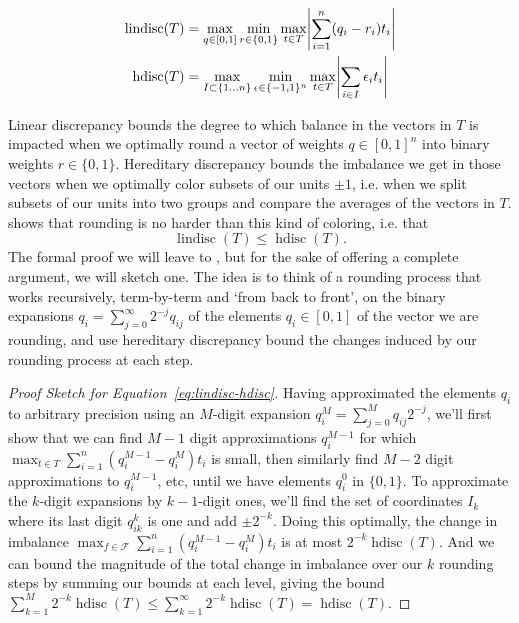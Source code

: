 \documentclass{article}
\DeclarePairedDelimiter\abs{\lvert}{\rvert}
\theoremstyle{definition}
\DeclareMathOperator{\hdisc}{hdisc}
\DeclareMathOperator{\lindisc}{lindisc}
\newcommand{\F}{\ensuremath{\mathcal{F}}}
\newcommand{\<}{\langle}
\renewcommand{\>}{\rangle}
\begin{document}
\begin{refsection}
\begin{equation}
\begin{aligned}
  \label{eq:discrepancy}
  \lindisc(T) &= \max_{q \in [0,1]}\min_{r \in \{0,1\}}\max_{t \in T}\abs*{\sum_{i=1}^n (q_i-r_i) t_i} \\
  \hdisc(T) &= \max_{I \subset \{1 \ldots n\}}\min_{\epsilon \in \{-1,1\}^n}\max_{t \in T} \abs*{\sum_{i\in I} \epsilon_i t_i}
\end{aligned}
\end{equation}

Linear discrepancy bounds the degree to which balance in the vectors in $T$ is impacted
when we optimally round a vector of weights $q \in [0,1]^n$ into binary weights $r \in \{0,1\}$.
Hereditary discrepancy bounds the imbalance we get in those vectors when we optimally
color subsets of our units $\pm 1$, i.e. when we split subsets of our units into two groups and
compare the averages of the vectors in $T$. \citet[Corollary 1]{lovasz1986discrepancy} shows that rounding
is no harder than this kind of coloring, i.e. that
\begin{equation}
\label{eq:lindisc-hdisc}
\lindisc(T) \le \hdisc(T).
\end{equation}
The formal proof we will leave to \citet{lovasz1986discrepancy}, but for the
sake of offering a complete argument, we will sketch one. The idea is to think of a rounding process that
works recursively, term-by-term  and `from back to front', on the binary expansions $q_i = \sum_{j=0}^{\infty} 2^{-j} q_{ij}$
of the elements $q_i \in [0,1]$ of the vector we are rounding, and use hereditary discrepancy bound the changes induced
by our rounding process at each step.
\begin{proof}[Proof Sketch for Equation~\ref{eq:lindisc-hdisc}]
Having approximated the elements $q_i$ to arbitrary precision using an $M$-digit expansion
$q_i^M=\sum_{j=0}^M q_{ij} 2^{-j}$,
we'll first show that we can find $M-1$ digit approximations $q_i^{M-1}$ for which
$\max_{t \in T} \sum_{i=1}^n (q_i^{M-1}-q_i^M)t_i$ is small, then similarly
find $M-2$ digit approximations to $q_i^{M-1}$, etc, until we have elements $q_i^0$ in $\{0,1\}$.
To approximate the $k$-digit expansions by $k-1$-digit ones, we'll find the set of coordinates
$I_k$ where its last digit $q^k_{ik}$ is one and add $\pm 2^{-k}$. Doing this optimally, the
change in imbalance $\max_{f \in \F} \sum_{i = 1}^n (q_i^{M-1}-q_i^M)t_i$ is at most $2^{-k}\hdisc(T)$.
And we can bound the magnitude of the total change in imbalance over our $k$ rounding steps by
summing our bounds at each level, giving the bound $\sum_{k=1}^{M} 2^{-k} \hdisc(T) \le \sum_{k=1}^{\infty} 2^{-k} \hdisc(T)= \hdisc(T)$.
\end{proof}


\end{refsection}
\end{document}
